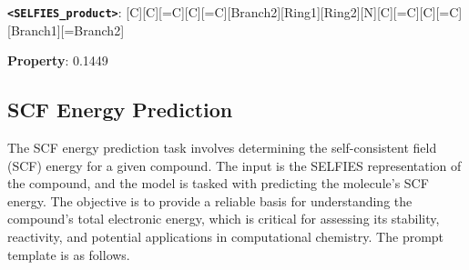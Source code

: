 \begin{tcolorbox}[colback=white!98!black,colframe=white!30!black,boxsep=1.1pt,top=6.75pt]
\begin{tcolorbox}[colback=cyan!7!white,colframe=white!98!black,boxsep=1.1pt,top=6.75pt]
{\tt \textbf{<SELFIES\_product>}}: 
[C][C][=C][C][=C][Branch2][Ring1][Ring2][N][C][=C][C][=C][Branch1][=Branch2]\-[C][Branch1][C][F][Branch1][C][F][F][C] [=C][Ring1][\#Branch2][C][=C][Ring1][P]
\end{tcolorbox}

\begin{tcolorbox}[colback=orange!7!white,colframe=white!98!black,boxsep=1.1pt,top=6.75pt]
\textbf{Property}: 0.1449
\end{tcolorbox}

\end{tcolorbox}

\subsection{SCF Energy Prediction}
The SCF energy prediction task involves determining the self-consistent field (SCF) energy for a given compound. The input is the SELFIES representation of the compound, and the model is tasked with predicting the molecule’s SCF energy. The objective is to provide a reliable basis for understanding the compound’s total electronic energy, which is critical for assessing its stability, reactivity, and potential applications in computational chemistry. The prompt template is as follows.


